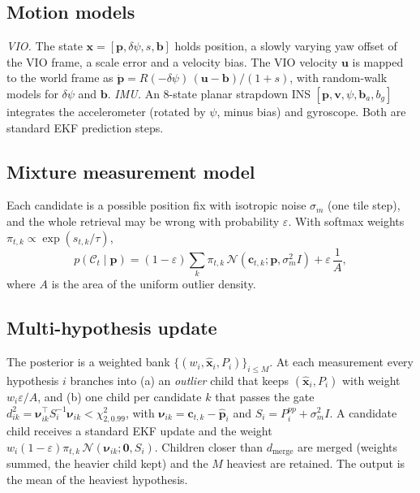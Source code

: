 \documentclass[journal]{IEEEtran}
\begin{document}
\subsection{Motion models}
\emph{VIO.} The state $\mathbf{x}=[\mathbf{p}, \delta\psi, s, \mathbf{b}]$ holds position, a slowly varying yaw offset
of the VIO frame, a scale error and a velocity bias. The VIO velocity $\mathbf{u}$ is mapped to the world frame as
$\dot{\mathbf{p}} = R(-\delta\psi)\,(\mathbf{u}-\mathbf{b})/(1+s)$, with random-walk models for $\delta\psi$ and $\mathbf{b}$.
\emph{IMU.} An 8-state planar strapdown INS $[\mathbf{p},\mathbf{v},\psi,\mathbf{b}_a, b_g]$ integrates the
accelerometer (rotated by $\psi$, minus bias) and gyroscope. Both are standard EKF prediction steps.

\subsection{Mixture measurement model}
Each candidate is a possible position fix with isotropic noise $\sigma_m$ (one tile step), and the whole retrieval may be
wrong with probability $\varepsilon$. With softmax weights $\pi_{t,k}\propto\exp(s_{t,k}/\tau)$,
\begin{equation}
p(\mathcal{C}_t\mid\mathbf{p}) = (1-\varepsilon)\sum_{k}\pi_{t,k}\,\mathcal{N}(\mathbf{c}_{t,k};\mathbf{p},\sigma_m^2 I)
+ \varepsilon\,\frac{1}{A},
\label{eq:mix}
\end{equation}
where $A$ is the area of the uniform outlier density.

\subsection{Multi-hypothesis update}
The posterior is a weighted bank $\{(w_i,\hat{\mathbf{x}}_i,P_i)\}_{i\le M}$. At each measurement every hypothesis $i$
branches into (a) an \emph{outlier} child that keeps $(\hat{\mathbf{x}}_i,P_i)$ with weight $w_i\varepsilon/A$, and
(b) one child per candidate $k$ that passes the gate
$d^2_{ik}=\boldsymbol{\nu}_{ik}^\top S_i^{-1}\boldsymbol{\nu}_{ik}<\chi^2_{2,0.99}$, with
$\boldsymbol{\nu}_{ik}=\mathbf{c}_{t,k}-\hat{\mathbf{p}}_i$ and $S_i=P_i^{pp}+\sigma_m^2I$. A candidate child receives a
standard EKF update and the weight $w_i(1-\varepsilon)\pi_{t,k}\,\mathcal{N}(\boldsymbol{\nu}_{ik};\mathbf{0},S_i)$.
Children closer than $d_{\mathrm{merge}}$ are merged (weights summed, the heavier child kept) and the $M$ heaviest are
retained. The output is the mean of the heaviest hypothesis.
\end{document}
